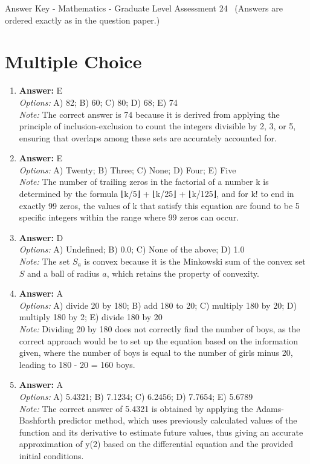 \documentclass[12pt]{article}
\begin{document}
\begin{center}
Answer Key - Mathematics - Graduate Level Assessment 24 \
\small (Answers are ordered exactly as in the question paper.)
\end{center}

\section*{Multiple Choice}
\begin{enumerate}[label=\arabic*.]
\item \textbf{Answer:} E
\\ \textit{Options:} A) 82; B) 60; C) 80; D) 68; E) 74
\\ \textit{Note:} The correct answer is 74 because it is derived from applying the principle of inclusion-exclusion to count the integers divisible by 2, 3, or 5, ensuring that overlaps among these sets are accurately accounted for.
\item \textbf{Answer:} E
\\ \textit{Options:} A) Twenty; B) Three; C) None; D) Four; E) Five
\\ \textit{Note:} The number of trailing zeros in the factorial of a number k is determined by the formula ⌊k/5⌋ + ⌊k/25⌋ + ⌊k/125⌋, and for k! to end in exactly 99 zeros, the values of k that satisfy this equation are found to be 5 specific integers within the range where 99 zeros can occur.
\item \textbf{Answer:} D
\\ \textit{Options:} A) Undefined; B) 0.0; C) None of the above; D) 1.0
\\ \textit{Note:} The set \( S_a \) is convex because it is the Minkowski sum of the convex set \( S \) and a ball of radius \( a \), which retains the property of convexity.
\item \textbf{Answer:} A
\\ \textit{Options:} A) divide 20 by 180; B) add 180 to 20; C) multiply 180 by 20; D) multiply 180 by 2; E) divide 180 by 20
\\ \textit{Note:} Dividing 20 by 180 does not correctly find the number of boys, as the correct approach would be to set up the equation based on the information given, where the number of boys is equal to the number of girls minus 20, leading to 180 - 20 = 160 boys.
\item \textbf{Answer:} A
\\ \textit{Options:} A) 5.4321; B) 7.1234; C) 6.2456; D) 7.7654; E) 5.6789
\\ \textit{Note:} The correct answer of 5.4321 is obtained by applying the Adams-Bashforth predictor method, which uses previously calculated values of the function and its derivative to estimate future values, thus giving an accurate approximation of y(2) based on the differential equation and the provided initial conditions.
\end{enumerate}
\end{document}

